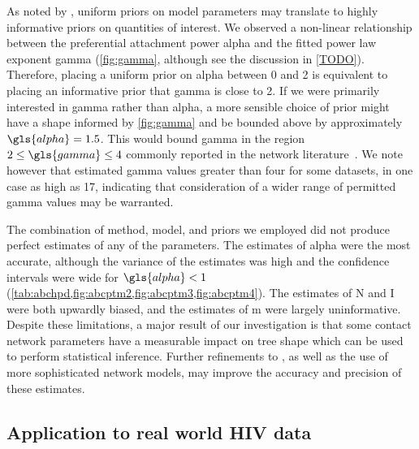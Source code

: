 As noted by \textcite{lintusaari2016identifiability}, uniform priors on model
parameters may translate to highly informative priors on quantities of
interest. We observed a non-linear relationship between the preferential
attachment power \gls{alpha} and the fitted power law exponent \gls{gamma}
(\cref{fig:gamma}, although see the discussion in \cref{TODO}). Therefore,
placing a uniform prior on \gls{alpha} between 0 and 2 is equivalent to placing an
informative prior that \gls{gamma} is close to 2. If we were primarily
interested in \gls{gamma} rather than \gls{alpha}, a more sensible choice of
prior might have a shape informed by \cref{fig:gamma} and be bounded above by
approximately $\gls{alpha} = 1.5$. This would bound \gls{gamma} in the region
$2 \leq \gls{gamma} \leq 4$ commonly reported in the network
literature~\autocite{liljeros2001web, schneeberger2004scale, colgate1989risk,
clemenccon2015statistical, brown2011transmission}. We note however that
\textcite{jones2003assessment} estimated \gls{gamma} values greater than four
for some datasets, in one case as high as 17, indicating that consideration of
a wider range of permitted \gls{gamma} values may be warranted.

The combination of method, model, and priors we employed did not produce
perfect estimates of any of the parameters. The estimates of \gls{alpha} were
the most accurate, although the variance of the estimates was high and the
confidence intervals were wide for $\gls{alpha} < 1$
(\cref{tab:abchpd,fig:abcptm2,fig:abcptm3,fig:abcptm4}). The estimates of
\gls{N} and \gls{I} were both upwardly biased, and the estimates of \gls{m}
were largely uninformative. Despite these limitations, a major result of our
investigation is that some contact network parameters have a measurable impact
on tree shape which can be used to perform statistical inference. Further
refinements to , as well as the use of more sophisticated
network models, may improve the accuracy and precision of these estimates.

\subsection{Application to real world HIV data}

